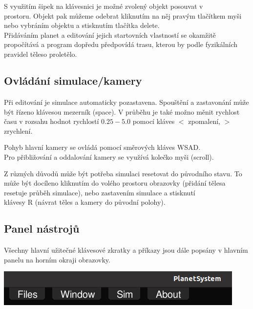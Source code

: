 \documentclass[a4paper, 12pt]{article}
\begin{document}
S využitím šipek na klávesnici je možné zvolený objekt posouvat v
\\prostoru. Objekt pak můžeme odebrat kliknutím na něj pravým tlačítkem myši
nebo vybráním objektu a stisknutím tlačítka delete.\\
\linebreak
Přidáváním planet a editování jejich startovních vlastností se okamžitě
propočítává a program dopředu předpovídá trasu, kterou by podle fyzikálních
pravidel těleso proletělo.

\newpage
\subsection{Ovládání simulace/kamery}
\paragraph{}
Při editování je simulace automaticky pozastavena. Spouštění a zastavonání může
být řízeno klávesou mezerník (space). V průběhu je také možno měnit rychlost
času v rozsahu hodnot rychlostí $0.25-5.0$ pomocí kláves $<$ zpomalení, $>$
zrychlení.

Pohyb hlavní kamery se ovládá pomocí směrových kláves WSAD. \\Pro přibližování a
oddalování kamery se využívá kolečko myši (scroll).

Z různých důvodů může být potřeba simulaci resetovat do původního stavu. To
může být docíleno kliknutím do volého prostoru obrazovky (přidání tělesa
resetuje průběh simulace), nebo zastavením simulace a stisknutí\\ klávesy R
(návrat těles a kamery do původní polohy).

\subsection{Panel nástrojů}
\paragraph{}
Všechny hlavní užitečné klávesové zkratky a příkazy jsou dále popsány v hlavním
panelu na horním okraji obrazovky.

\begin{center}
\includegraphics[width=0.8\linewidth]{pics/p3_crop.png}
\end{center}
\end{document}
